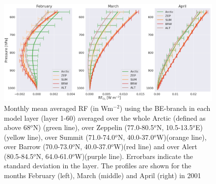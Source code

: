 \begin{figure}[ht]
    \centering
    \includegraphics[width = \linewidth]{Chapter6_Results/images/RF/vert_RF_FebApr_2001.png}
    \caption{Monthly mean averaged RF (in Wm$^{-2}$) using the BE-branch in each model layer (layer 1-60) averaged over the whole Arctic (defined as above 68$^o$N) (green line), over Zeppelin (77.0-80.5$^o$N, 10.5-13.5$^o$E) (yellow line), over Summit (71.0-74.0$^o$N, 40.0-37.0$^o$W)(orange line), over Barrow (70.0-73.0$^o$N, 40.0-37.0$^o$W)(red line) and over Alert (80.5-84.5$^o$N, 64.0-61.0$^o$W)(purple line). Errorbars indicate the standard deviation in the layer. The profiles are shown for the months February (left), March (middle) and April (right) in 2001}
    \label{fig:vert_RF_FebApr_2001}
\end{figure}